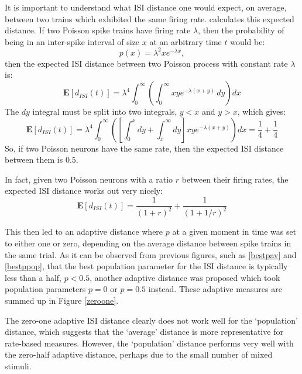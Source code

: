 It is important to understand what ISI distance one would expect, on average, between two trains which exhibited the same firing rate.  \citep{MulanskyEtAl2015a} calculates this expected distance. If two Poisson spike trains have firing rate $\lambda$, then the probability of being in an inter-spike interval of size $x$ at an arbitrary time $t$ would be:
\begin{equation}
p(x) = \lambda^2 x e^{-\lambda x},
\end{equation}
then the expected ISI distance between two Poisson process with constant rate $\lambda$ is:
\begin{equation}
\mathbf{E}[d_{ISI}(t)] = \lambda^4 \int_0^{\infty} \left( \int_0^{\infty} xye^{-\lambda(x+y)}\,dy\right) dx
\end{equation}
The $dy$ integral must be split into two integrals, $y<x$ and $y>x$, which gives:
\begin{equation}
\mathbf{E}[d_{ISI}(t)]  = \lambda^4 \int_0^{\infty}\left(  \left[\int_0^xdy +\int_x^{\infty}dy\right] xye^{-\lambda(x+y)} \right)dx = \frac{1}{4} + \frac{1}{4}
\end{equation}
So, if two Poisson neurons have the same rate, then the expected ISI distance between them is $0.5$.

In fact, given two Poisson neurons with a ratio $r$ between their firing rates, the expected ISI distance works out very nicely:
\begin{equation}
\mathbf{E}[d_{ISI}(t)] = \frac{1}{(1+r)^2} + \frac{1}{(1+1/r)^2}
\end{equation}

This then led to an adaptive distance where $p$ at a given moment in time was set to either one or zero, depending on the average distance between spike trains in the same trial.  As it can be observed from previous figures, such as \ref{bestpav} and \ref{bestppop}, that the best population parameter for the ISI distance is typically less than a half, $p<0.5$, another adaptive distance was proposed which took population parameters $p=0$ or $p=0.5$ instead. These adaptive measures are summed up in Figure \ref{zeroone}.

The zero-one adaptive ISI distance clearly does not work well for the \lq{}population\rq{} distance, which suggests that the \lq{}average\rq{} distance is more representative for rate-based measures.  However, the \lq{}population\rq{} distance performs very well with the zero-half adaptive distance, perhaps due to the small number of mixed stimuli. 

